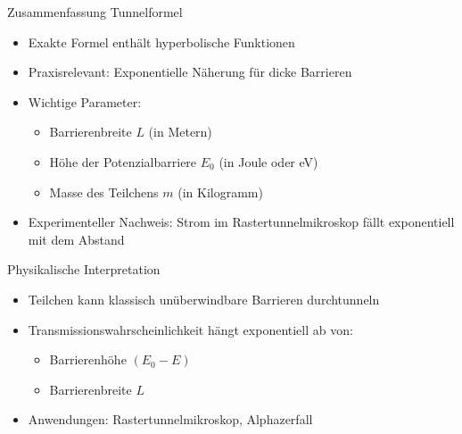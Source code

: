 \documentclass{beamer}
\begin{document}
    \begin{frame}{Zusammenfassung Tunnelformel}
        \begin{itemize}
            \item Exakte Formel enthält hyperbolische Funktionen
            \item Praxisrelevant: Exponentielle Näherung für dicke Barrieren
            \item Wichtige Parameter:
            \begin{itemize}
                \item Barrierenbreite \( L \) (in Metern)
                \item Höhe der Potenzialbarriere \( E_0 \) (in Joule oder eV)
                \item Masse des Teilchens \( m \) (in Kilogramm)
            \end{itemize}
            \item Experimenteller Nachweis: Strom im Rastertunnelmikroskop fällt exponentiell mit dem Abstand
        \end{itemize}
    \end{frame}

    \begin{frame}{Physikalische Interpretation}
        \begin{itemize}
            \item Teilchen kann klassisch unüberwindbare Barrieren durchtunneln
            \item Transmissionswahrscheinlichkeit hängt exponentiell ab von:
            \begin{itemize}
                \item Barrierenhöhe $(E_0 - E)$
                \item Barrierenbreite $L$
            \end{itemize}
            \item Anwendungen: Rastertunnelmikroskop, Alphazerfall
        \end{itemize}
    \end{frame}


\end{document}

